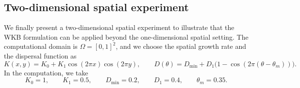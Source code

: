 \documentclass[11pt]{article}
\numberwithin{equation}{section}
\begin{document}




%




\subsection{Two-dimensional spatial experiment}\label{subsec:test_2d_new}

We finally present a two-dimensional spatial experiment to illustrate that the
WKB formulation can be applied beyond the one-dimensional spatial setting.  The
computational domain is $\Omega=[0,1]^2$, and we choose the spatial growth
rate and the dispersal function as
$$
K(x,y)=K_0+K_1\cos(2\pi x)\cos(2\pi y),
\qquad
D(\theta)=D_{\min}+D_1\bigl(1-\cos(2\pi(\theta-\theta_m))\bigr).
$$
In the computation, we take
$$
K_0=1,\qquad K_1=0.5,\qquad D_{\min}=0.2,\qquad D_1=0.4,
\qquad \theta_m=0.35 .
$$
\end{document}
